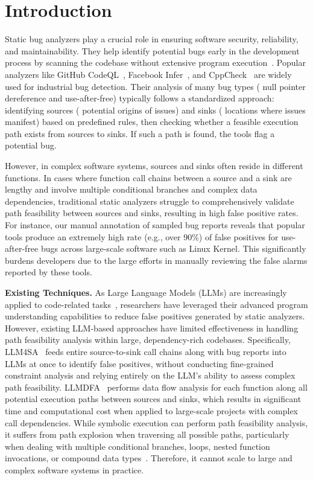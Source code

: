 \section{Introduction}

Static bug analyzers play a crucial role in ensuring software security, reliability, and maintainability. They help identify potential bugs early in the development process by scanning the codebase without extensive program execution~\cite{cai2023place,cai2022peahen,cai2021canary,shi2020conquering,shi2018pinpoint,sui2012static,vassallo2020developers,yan2018spatio}. Popular analyzers like GitHub CodeQL~\cite{codeql}, Facebook Infer~\cite{infer}, and CppCheck~\cite{cppcheck} are widely used for industrial bug detection. Their analysis of many bug types (\eg{} null pointer dereference and use-after-free) typically follows a standardized approach: identifying sources (\ie{} potential origins of issues) and sinks (\ie{} locations where issues manifest) based on predefined rules, then checking whether a feasible execution path exists from sources to sinks. If such a path is found, the tools flag a potential bug.

However, in complex software systems, sources and sinks often reside in different functions. In cases where function call chains between a source and a sink are lengthy and involve multiple conditional branches and complex data dependencies, traditional static analyzers struggle to comprehensively validate path feasibility between sources and sinks, resulting in high false positive rates. For instance, our manual annotation of sampled bug reports reveals that popular tools produce an extremely high rate (e.g., over 90\%) of false positives for use-after-free bugs across large-scale software such as Linux Kernel. This significantly burdens developers due to the large efforts in manually reviewing the false alarms reported by these tools. 

\textbf{Existing Techniques.} As Large Language Models (LLMs) are increasingly applied to code-related tasks~\cite{du2024evaluating,liu2024large,nam2024using, du2024vulragenhancingllmbasedvulnerability}, researchers have leveraged their advanced program understanding capabilities to reduce false positives generated by static analyzers. However, existing LLM-based approaches have limited effectiveness in handling path feasibility analysis within large, dependency-rich codebases. Specifically, LLM4SA~\cite{llm4sa} feeds entire source-to-sink call chains along with bug reports into LLMs at once to identify false positives, without conducting fine-grained constraint analysis and relying entirely on the LLM's ability to assess complex path feasibility. LLMDFA~\cite{llmdfa} performs data flow analysis for each function along all potential execution paths between sources and sinks, which results in significant time and computational cost when applied to large-scale projects with complex call dependencies.
While symbolic execution can perform path feasibility analysis, it suffers from path explosion when traversing all possible paths, particularly when dealing with multiple conditional branches, loops, nested function invocations, or compound data types~\cite{10.1145/3182657}. Therefore, it cannot scale to large and complex software systems in practice. 

